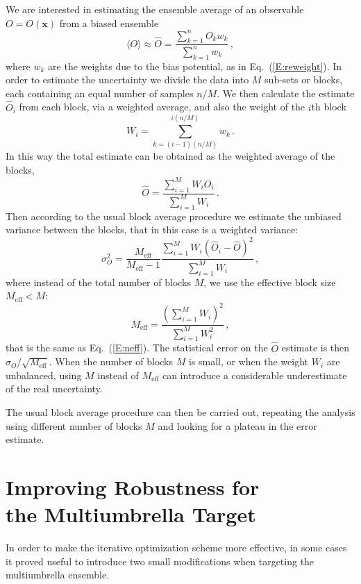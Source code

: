\documentclass[aps,prx,reprint,superscriptaddress]{revtex4-1} %
\begin{document}
We are interested in estimating the ensemble average of an observable $O=O(\mathbf{x})$ from a biased ensemble
\begin{equation}
  \langle O \rangle \approx \hat{O}=\frac{\sum_{k=1}^n O_k w_k}{\sum_{k=1}^n w_k}\, ,
\end{equation}
where $w_k$ are the weights due to the bias potential, as in Eq.~(\ref{E:reweight}).
In order to estimate the uncertainty we divide the data into $M$ sub-sets or blocks, each containing an equal number of samples $n/M$.
We then calculate the estimate $\hat{O}_i$ from each block, via a weighted average, and also the weight of the $i$th block
\begin{equation}
    W_i=\sum_{k=(i-1) (n/M)}^{i (n/M)} w_k \, .
\end{equation}
In this way the total estimate can be obtained as the weighted average of the blocks,
\begin{equation}
    \hat{O}=\frac{\sum_{i=1}^M W_i \hat{O}_i}{\sum_{i=1}^M W_i}\, .
\end{equation}
Then according to the usual block average procedure we estimate the unbiased variance between the blocks, that in this case is a weighted variance:
\begin{equation}
    \sigma^2_O=\frac{M_{\text{eff}}}{M_{\text{eff}}-1}\frac{\sum_{i=1}^M W_i (\hat{O}_i-\hat{O})^2}{\sum_{i=1}^M W_i}\, ,
\end{equation}
where instead of the total number of blocks $M$, we use the effective block size $M_{\text{eff}}<M$:
\begin{equation}
    M_{\text{eff}}=\frac{\left(\sum_{i=1}^M W_i\right)^2}{\sum_{i=1}^M W_i^2}\, ,
\end{equation}
that is the same as Eq.~(\ref{E:neff}).
The statistical error on the $\hat{O}$ estimate is then $\sigma_O/\sqrt{M_{\text{eff}}}$. 
When the number of blocks $M$ is small, or when the weight $W_i$ are unbalanced, using $M$ instead of $M_{\text{eff}}$ can introduce a considerable underestimate of the real uncertainty.

The usual block average procedure can then be carried out, repeating the analysis using different number of blocks $M$ and looking for a plateau in the error estimate.

\section{Improving Robustness for\\the Multiumbrella Target\label{A:robustness}}
In order to make the iterative optimization scheme more effective, in some cases it proved useful to introduce two small modifications when targeting the multiumbrella ensemble.
\end{document}
